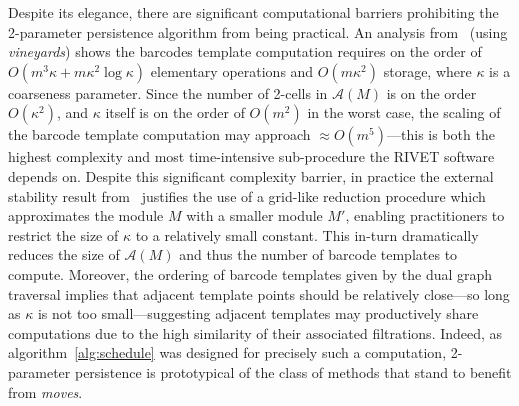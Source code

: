 \documentclass[sn-mathphys]{sn-jnl}
\begin{document}
Despite its elegance, there are significant computational barriers prohibiting the 2-parameter persistence algorithm from being practical. 
An analysis from~\cite{lesnick2015interactive} (using \emph{vineyards}) shows the barcodes template computation requires on the order of $O(m^3 \kappa + m \kappa^2 \log \kappa)$ elementary operations and $O(m \kappa^2)$ storage, where $\kappa$ is a coarseness parameter.
Since the number of 2-cells in $\mathcal{A}(M)$ is on the order $O(\kappa^2)$, and $\kappa$ itself is on the order of $O(m^2)$ in the worst case, the scaling of the barcode template computation may approach $\approx O(m^5)$---this is both the highest complexity and most time-intensive sub-procedure the RIVET software~\cite{rivet} depends on. 
Despite this significant complexity barrier, in practice the external stability result from~\cite{landi2014rank} justifies the use of a grid-like reduction procedure which approximates the module $M$ with a smaller module $M'$, enabling practitioners to restrict the size of $\kappa$ to a relatively small constant. 
This in-turn dramatically reduces the size of $\mathcal{A}(M)$ and thus the number of barcode templates to compute. 
Moreover, the ordering of barcode templates given by the dual graph traversal implies that adjacent  template points should be relatively close---so long as $\kappa$ is not too small---suggesting adjacent templates may productively share computations due to the high similarity of their associated filtrations. 
Indeed, as algorithm~\ref{alg:schedule} was designed for precisely such a computation, 2-parameter persistence is prototypical of the class of methods that stand to benefit from \emph{moves}. 
\end{document}
